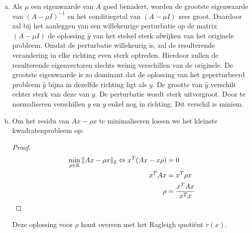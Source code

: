 \documentclass[a4paper]{article}
\begin{document}
\begin{enumerate}[a)] %
\item Als $\mu$ een eigenwaarde van $A$ goed benadert, worden de grootste eigenwaarde van $(A-\mu I)^{-1}$ en het conditiegetal van $(A-\mu I)$ zeer groot. Daardoor zal bij het aanleggen van een willekeurige perturbatie op de matrix $(A-\mu I)$ de oplossing $\hat{y}$ van het stelsel sterk afwijken van het originele probleem. Omdat de perturbatie willekeurig is, zal de resulterende verandering in elke richting even sterk optreden. Hierdoor zullen de resulterende eigenvectoren slechts weinig verschillen van de originele. De grootste eigenwaarde is zo dominant dat de oplossing van het geperturbeerd probleem $\hat{y}$ bijna in dezelfde richting ligt als $y$. De grootte van $\hat{y}$ verschilt echter sterk van deze van $y$. De perturbatie wordt sterk uitvergroot. Door te normaliseren verschillen $\hat{y}$ en $y$ enkel nog in richting. Dit verschil is miniem.
\item Om het residu van $Ax-\rho x$ te minimaliseren lossen we het kleinste kwadratenprobleem op:
\begin{proof}
\begin{align}
\displaystyle\min_{\rho\in\mathbb{R}}\Arrowvert Ax-\rho x \Arrowvert _2 \Leftrightarrow x^{T}(Ax-x\rho) &= 0\label{eq1}\\
 x^TAx &= x^T\rho x \label{eq2}\\
 \rho&=\frac{x^TAx}{x^Tx} \label{eq:const1}
\end{align}
\end{proof}
Deze oplossing voor $\rho$ komt overeen met het Ragleigh quoti\"{e}nt $r(x)$.
\end{enumerate}
\end{document}
